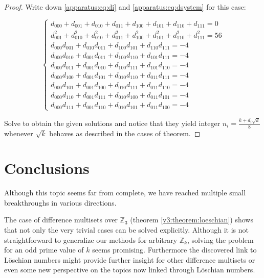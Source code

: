 \documentclass{article}
\theoremstyle{plain}
\theoremstyle{definition}
\theoremstyle{remark}
\begin{document}
			\begin{proof}
				Write down \eqref{apparatus:eq:di} and \eqref{apparatus:eq:dsystem} for this case:
				
				\begin{equation}
					\begin{cases}
                        d_{000} + d_{001} + d_{010} + d_{011} + d_{100}  + d_{101}  + d_{110}  + d_{111} = 0 \\
                        d_{001}^2 + d_{010}^2 + d_{010}^2 + d_{011}^2 + d_{100}^2 + d_{101}^2 + d_{110}^2 + d_{111}^2 = 56 \\
                        d_{000} d_{001} + d_{010} d_{011} + d_{100} d_{101} +  d_{110} d_{111} = -4 \\
                        d_{000} d_{010} + d_{001} d_{011} + d_{100} d_{110} +  d_{101} d_{111} = -4 \\
                        d_{000} d_{011} + d_{001} d_{010} + d_{100} d_{111} +  d_{101} d_{110} = -4 \\
                        d_{000} d_{100} + d_{001} d_{101} + d_{010} d_{110} +  d_{011} d_{111} = -4 \\
                        d_{000} d_{101} +  d_{001} d_{100} + d_{010} d_{111} + d_{011} d_{110} = -4 \\
                        d_{000} d_{110} + d_{001} d_{111} + d_{010} d_{100} + d_{011} d_{101} = -4 \\
                        d_{000} d_{111} + d_{001} d_{110} + d_{010} d_{101} +  d_{011} d_{100} = -4
					\end{cases}
				\end{equation}
				
				Solve to obtain the given solutions and notice that they yield integer $n_i = \frac{k+d_i \sqrt k}8$ whenever $\sqrt k$ behaves as described in the cases of theorem.
			\end{proof}

	\section{Conclusions}
		Although this topic seems far from complete, we have reached multiple small breakthroughs in various directions.
		
		The case of difference multisets over $\mathbb Z_3$ (theorem \ref{v3:theorem:loeschian}) shows that not only the very trivial cases can be solved explicitly. Although it is not straightforward to generalize our methods for arbitrary $\mathbb Z_k$, solving the problem for an odd prime value of $k$ seems promising. Furthermore the discovered link to Löschian numbers might provide further insight for other difference multisets or even some new perspective on the topics now linked through Löschian numbers.
		
\end{document}
